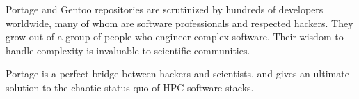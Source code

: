 \documentclass[a4paper,conference]{IEEEtran}
\begin{document}
Portage and Gentoo repositories are scrutinized by hundreds of
developers worldwide, many of whom are software professionals and
respected hackers. They grow out of a group of people who engineer
complex software. Their wisdom to handle complexity is invaluable to
scientific communities.

Portage is a perfect bridge between hackers and scientists, and gives
an ultimate solution to the chaotic status quo of HPC software stacks.


\end{document}
